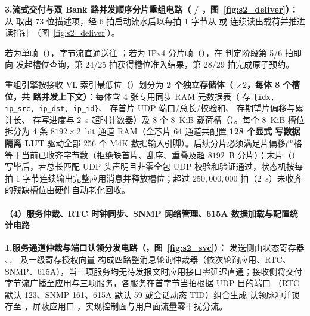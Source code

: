 \noindent \textbf{3.\quad 流式交付与双 Bank \ReasmContexts{} 路并发顺序分片重组电路（ / ，图~\ref{fig:s2_deliver}）：}
 从  取出 73 位描述项，经 6 拍启动流水后以每拍 1 字节从  或  连续读出载荷并推进读指针 （图~\ref{fig:s2_deliver}）。


若为单帧（），字节流直通送往 ；若为 IPv4 分片帧（），在  判定阶段第 5/6 拍即向  发起槽位查询，第 24/25 拍获得槽位准入结果，第 28/29 拍完成原子预约。

重组引擎按接收 VL 索引最低位（）划分为 \textbf{2 个独立存储体（ $\times 2$，每体 8 个槽位，共 \ReasmContexts{} 路并发上下文）}：每体含 4 张专用同步 RAM 元数据表（ 存 \texttt{\{idx, ip\_src, ip\_dst, ip\_id\}}、 存首片 UDP 端口/总长/校验和、 存期望片偏移与累计长、 存写进度与 2~s 超时计数器）及 8 个 8~KiB 载荷槽（）。每个 8~KiB 槽位拆分为 4 条 $8192\times 2$~bit 通道 RAM（全芯片 64 通道共配置 \textbf{128 个显式  写数据隔离 LUT} 驱动全部 256 个 M4K 数据输入引脚）。后续分片必须满足片偏移严格等于当前已收齐字节数（拒绝缺首片、乱序、重叠及超 $8192$~B 分片）；末片（）写毕后，若总长匹配 UDP 头声明且非零全包 UDP 校验和验证通过，状态机按每拍 1 字节连续输出完整应用消息并释放槽位；超过 $250,000,000$ 拍（2~s）未收齐的残缺槽位由硬件自动老化回收。

\begingroup
\setlength{\designFigureHeight}{.345\textheight}
\paragraph{（4）服务仲裁、RTC 时钟同步、SNMP 网络管理、615A 数据加载与配置统计电路}

\noindent \textbf{1.\quad 服务通道仲裁与端口认领分发电路（，图~\ref{fig:s2_svc}）：}
发送侧由状态寄存器 、、 及一级寄存授权向量  构成四路整消息轮询仲裁器（依次轮询应用、RTC、SNMP、615A），当三项服务均无待发报文时应用接口零延迟直通；接收侧将交付字节流广播至应用与三项服务，各服务在首字节当拍根据 UDP 目的端口 （RTC 默认 123、SNMP 161、615A 默认 59 或会话动态 TID）组合生成  认领脉冲并锁存至 ，屏蔽应用口 ，实现控制面与用户面流量零干扰分流。


